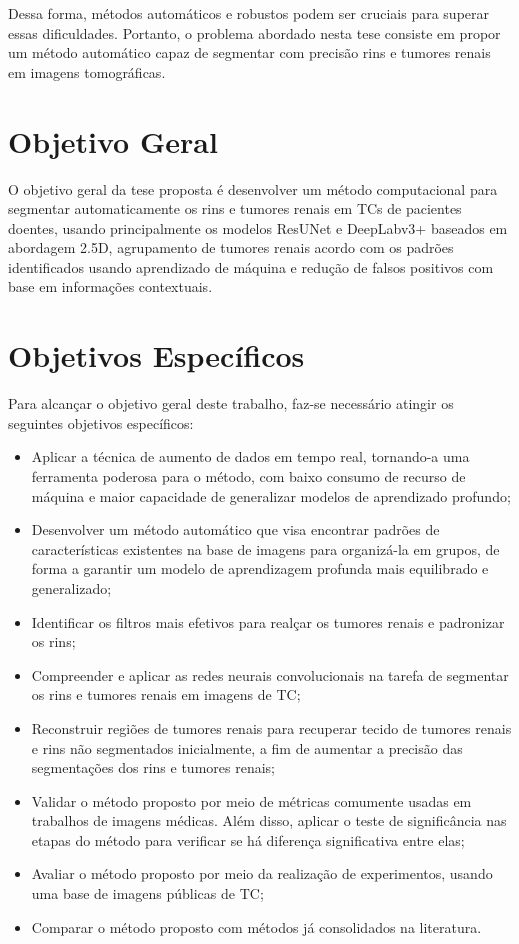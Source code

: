 Dessa forma, métodos automáticos e robustos podem ser cruciais para superar essas dificuldades. Portanto, o problema abordado nesta tese consiste em propor um método automático capaz de segmentar com precisão rins e tumores renais em imagens tomográficas.

\section{Objetivo Geral}
\label{sec:objetivo-geral}

O objetivo geral da tese proposta é desenvolver um método computacional para segmentar automaticamente os rins e tumores renais em TCs de pacientes doentes, usando principalmente os modelos ResUNet e DeepLabv3+ baseados em abordagem 2.5D, agrupamento de tumores renais acordo com os padrões identificados usando aprendizado de máquina e redução de falsos positivos com base em informações contextuais.

\section{Objetivos Específicos}
\label{sec:objetivos-especificos}

Para alcançar o objetivo geral deste trabalho, faz-se necessário atingir os seguintes objetivos específicos:

\begin{itemize}
    \item Aplicar a técnica de aumento de dados em tempo real, tornando-a uma ferramenta poderosa para o método, com baixo consumo de recurso de máquina e maior capacidade de generalizar modelos de aprendizado profundo;
    \item Desenvolver um método automático que visa encontrar padrões de características existentes na base de imagens para organizá-la em grupos, de forma a garantir um modelo de aprendizagem profunda mais equilibrado e generalizado;
    \item Identificar os filtros mais efetivos para realçar os tumores renais e padronizar os rins;
    \item Compreender e aplicar as redes neurais convolucionais na tarefa de segmentar os rins e tumores renais em imagens de TC;
    \item Reconstruir regiões de tumores renais para recuperar tecido de tumores renais e rins não segmentados inicialmente, a fim de aumentar a precisão das segmentações dos rins e tumores renais;
    \item Validar o método proposto por meio de métricas comumente usadas em trabalhos de imagens médicas. Além disso, aplicar o teste de significância nas etapas do método para verificar se há diferença significativa entre elas;
    \item Avaliar o método proposto por meio da realização de experimentos, usando uma base de imagens públicas de TC;
    \item Comparar o método proposto com métodos já consolidados na literatura.
\end{itemize}

